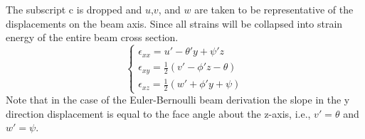 The subscript c is dropped and $ u $,$ v $, and $ w $ are taken to be representative of the displacements on the beam axis. Since all strains will be collapsed into strain energy of the entire beam cross section. 
\begin{equation}\label{eq:StrainEvaluatedSimple}
\left\{\begin{array}{l}
\epsilon_{xx}=u'-\theta'y+\psi'z\\
\epsilon_{xy}=\frac{1}{2}(v'-\phi'z-\theta)\\
\epsilon_{xz}=\frac{1}{2}(w'+\phi'y+\psi)
\end{array}\right.
\end{equation}
Note that in the case of the Euler-Bernoulli beam derivation the slope in the y direction displacement is equal to the face angle about the z-axis, i.e., $v'=\theta$ and $w'=\psi$.\

